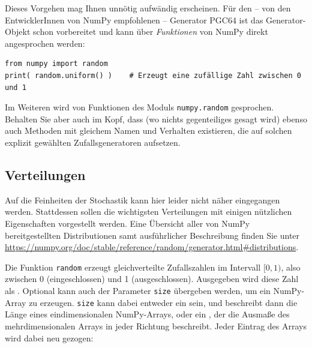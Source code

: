 Dieses Vorgehen mag Ihnen unnötig aufwändig erscheinen. Für den -- von den EntwicklerInnen von NumPy empfohlenen -- Generator PGC64 ist das Generator-Objekt schon vorbereitet und kann über \emph{Funktionen} von NumPy direkt angesprochen werden:

\begin{codebox}
\begin{verbatim}
from numpy import random
print( random.uniform() )    # Erzeugt eine zufällige Zahl zwischen 0 und 1
\end{verbatim}
\end{codebox}

Im Weiteren wird von Funktionen des Moduls \texttt{numpy.random} gesprochen. Behalten Sie aber auch im Kopf, dass (wo nichts gegenteiliges gesagt wird) ebenso auch Methoden mit gleichem Namen und Verhalten existieren, die auf solchen explizit gewählten Zufallsgeneratoren aufsetzen.

\subsection{Verteilungen}
Auf die Feinheiten der Stochastik kann hier leider nicht näher eingegangen werden. Stattdessen sollen die wichtigsten Verteilungen mit einigen nützlichen Eigenschaften vorgestellt werden. Eine Übersicht aller von NumPy bereitgestellten Distributionen samt ausführlicher Beschreibung finden Sie unter \url{https://numpy.org/doc/stable/reference/random/generator.html#distributions}.

Die Funktion \texttt{random} erzeugt gleichverteilte Zufallszahlen im Intervall $[0, 1)$, also zwischen 0 (eingeschlossen) und 1 (ausgeschlossen). Ausgegeben wird diese Zahl als . Optional kann auch der Parameter \texttt{size} übergeben werden, um ein NumPy-Array zu erzeugen. \texttt{size} kann dabei entweder ein  sein, und beschreibt dann die Länge eines eindimensionalen NumPy-Arrays, oder ein , der die Ausmaße des mehrdimensionalen Arrays in jeder Richtung beschreibt. Jeder Eintrag des Arrays wird dabei neu gezogen:

